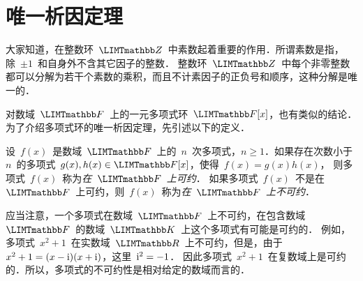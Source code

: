 
\section{唯一析因定理}\label{ch1se4}

大家知道，在整数环~$\mZ$~中素数起着重要的作用．所谓素数是指，除~$\pm1$~和自身外不含其它因子的整数．%
整数环~$\mZ$~中每个非零整数都可以分解为若干个素数的乘积，而且不计素因子的正负号和顺序，这种分解是唯一的．%

对数域~$\mF$~上的一元多项式环~$\mF[x]$，也有类似的结论．为了介绍多项式环的唯一析因定理，先引述以下的定义．%

\begin{definition}
设~$f(x)$~是数域~$\mF$~上的~$n$~次多项式，$n\ge1$．如果存在次数小于~$n$~的多项式~$g(x),h(x)\in\mF[x]$，使得~$f(x)=g(x)h(x)$，
则多项式~$f(x)$~称为\emph{在~$\mF$~上可约}．%
如果多项式~$f(x)$~不是在~$\mF$~上可约，则~$f(x)$~称为\emph{在~$\mF$~上不可约}．
\end{definition}

应当注意，一个多项式在数域~$\mF$~上不可约，在包含数域~$\mF$~的数域~$\mK$~上这个多项式有可能是可约的．%
例如，多项式~$x^2+1$~在实数域~$\mR$~上不可约，但是，由于~$x^2+1=(x-\mathrm i)(x+\mathrm i)$，这里~$\mathrm i^2=-1$．%
因此多项式~$x^2+1$~在复数域上是可约的．所以，多项式的不可约性是相对给定的数域而言的．%

